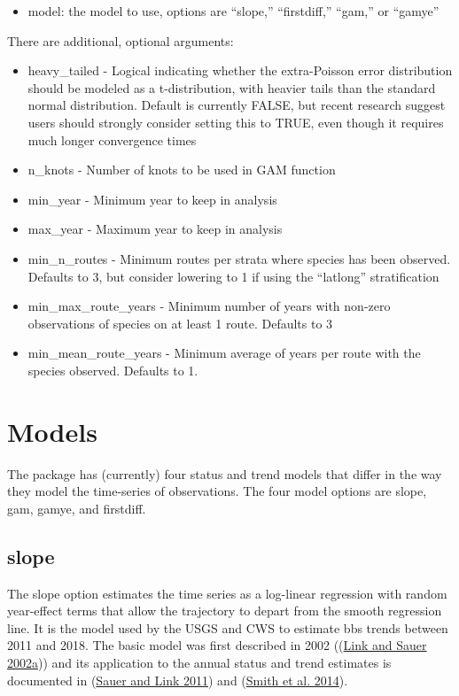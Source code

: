 \documentclass[
]{book}
\providecommand{\tightlist}{%
  \setlength{\itemsep}{0pt}\setlength{\parskip}{0pt}}
\begin{document}
\begin{itemize}
\tightlist
\item
  model: the model to use, options are ``slope,'' ``firstdiff,'' ``gam,'' or ``gamye''
\end{itemize}

There are additional, optional arguments:

\begin{itemize}
\item
  heavy\_tailed - Logical indicating whether the extra-Poisson error distribution should be modeled as a t-distribution, with heavier tails than the standard normal distribution. Default is currently FALSE, but recent research suggest users should strongly consider setting this to TRUE, even though it requires much longer convergence times
\item
  n\_knots - Number of knots to be used in GAM function
\item
  min\_year - Minimum year to keep in analysis
\item
  max\_year - Maximum year to keep in analysis
\item
  min\_n\_routes - Minimum routes per strata where species has been observed. Defaults to 3, but consider lowering to 1 if using the ``latlong'' stratification
\item
  min\_max\_route\_years - Minimum number of years with non-zero observations of species on at least 1 route. Defaults to 3
\item
  min\_mean\_route\_years - Minimum average of years per route with the species observed. Defaults to 1.
\end{itemize}

\hypertarget{models}{%
\section{Models}\label{models}}

The package has (currently) four status and trend models that differ in the way they model the time-series of observations. The four model options are slope, gam, gamye, and firstdiff.

\hypertarget{slope}{%
\subsection{slope}\label{slope}}

The slope option estimates the time series as a log-linear regression with random year-effect terms that allow the trajectory to depart from the smooth regression line. It is the model used by the USGS and CWS to estimate bbs trends between 2011 and 2018. The basic model was first described in 2002 ((\protect\hyperlink{ref-link2002}{Link and Sauer 2002a})) and its application to the annual status and trend estimates is documented in (\protect\hyperlink{ref-sauer2011}{Sauer and Link 2011}) and (\protect\hyperlink{ref-smith2014}{Smith et al. 2014}).
\end{document}
